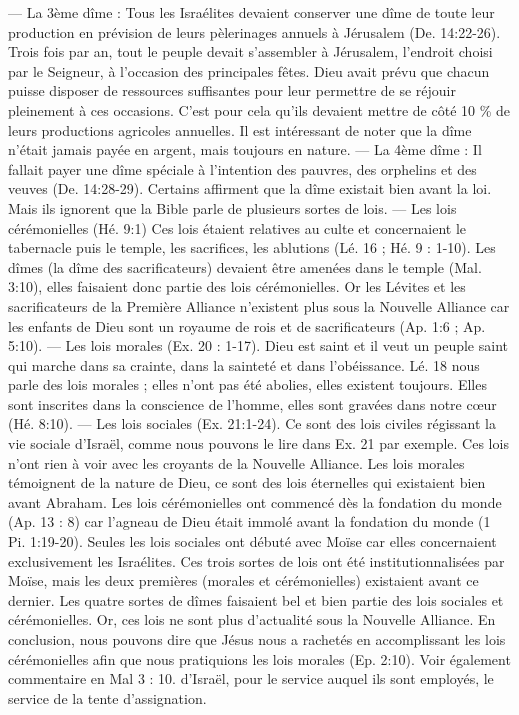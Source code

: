 \begin{multicols}{2}
{— La 3ème dîme : Tous les Israélites devaient conserver une dîme de toute leur production en prévision de leurs pèlerinages annuels à Jérusalem (De. 14:22-26).
Trois fois par an, tout le peuple devait s’assembler à Jérusalem, l’endroit choisi par le Seigneur, à l’occasion des principales fêtes. Dieu avait prévu que chacun puisse disposer de ressources suffisantes pour leur permettre de se réjouir pleinement à ces occasions. C’est pour cela qu’ils devaient mettre de côté 10 \% de leurs productions agricoles annuelles. Il est intéressant de noter que la dîme n’était jamais payée en argent, mais toujours en nature.
— La 4ème dîme : Il fallait payer une dîme spéciale à l’intention des pauvres, des orphelins et des veuves (De. 14:28-29). 
Certains affirment que la dîme existait bien avant la loi. Mais ils ignorent que la Bible parle de plusieurs sortes de lois.
— Les lois cérémonielles (Hé. 9:1)
Ces lois étaient relatives au culte et concernaient le tabernacle puis le temple,  les sacrifices, les ablutions (Lé. 16 ; Hé. 9 : 1-10). Les dîmes (la dîme des sacrificateurs) devaient être amenées dans le temple (Mal. 3:10), elles faisaient donc partie des lois cérémonielles. Or les Lévites et les sacrificateurs de la Première Alliance n’existent plus sous la Nouvelle Alliance car les enfants de Dieu sont un royaume de rois et de sacrificateurs (Ap. 1:6 ; Ap. 5:10).
— Les lois morales (Ex. 20 : 1-17). Dieu est saint et il veut un peuple saint qui marche dans sa crainte, dans la sainteté et dans l’obéissance. Lé. 18 nous parle des lois morales ; elles n’ont pas été abolies, elles existent toujours. Elles sont inscrites dans la conscience de l’homme, elles sont gravées dans notre cœur (Hé. 8:10).
— Les lois sociales (Ex. 21:1-24). Ce sont des lois civiles régissant la vie sociale d’Israël, comme nous pouvons le lire dans Ex. 21 par exemple. Ces lois n’ont rien à voir avec les croyants de la Nouvelle Alliance. Les lois morales témoignent de la nature de Dieu, ce sont des lois éternelles qui existaient bien avant Abraham. Les lois cérémonielles ont commencé dès la fondation du monde (Ap. 13 : 8) car l’agneau de Dieu était immolé avant la fondation du monde (1 Pi. 1:19-20). Seules les lois sociales ont débuté avec Moïse car elles concernaient exclusivement les Israélites. Ces trois sortes de lois ont été institutionnalisées par Moïse, mais les deux premières (morales et cérémonielles) existaient avant ce dernier. Les quatre sortes de dîmes faisaient bel et bien partie des lois sociales et cérémonielles. Or, ces lois ne sont plus d’actualité sous la Nouvelle Alliance. En conclusion, nous pouvons dire que Jésus nous a rachetés en accomplissant les lois cérémonielles afin que nous pratiquions les lois morales (Ep. 2:10). Voir  également commentaire en Mal 3 : 10.} d'Israël, pour le service auquel ils sont employés, le service de la tente d'assignation.

\end{multicols}

